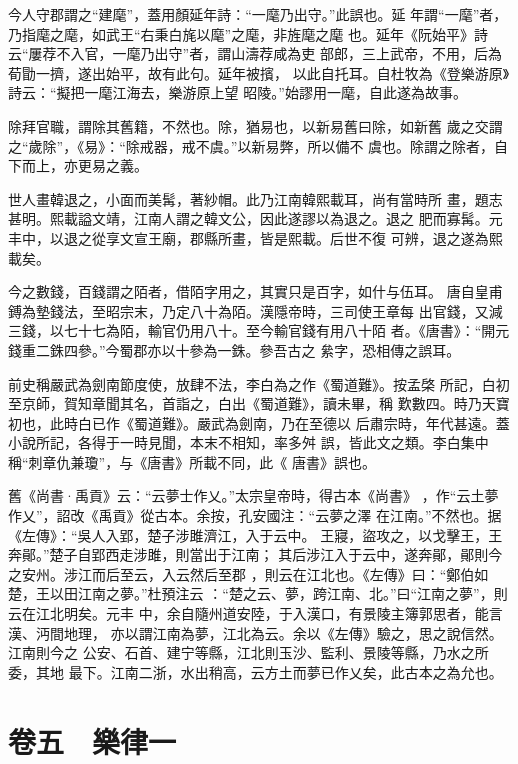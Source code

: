 \documentclass{ctexart}
\begin{document}
今人守郡謂之``建麾''，蓋用顏延年詩：``一麾乃出守。''此誤也。延 年謂``一麾''者，乃指麾之麾，如武王``右秉白旄以麾''之麾，非旌麾之麾 也。延年《阮始平》詩云``屢荐不入官，一麾乃出守''者，謂山濤荐咸為吏 部郎，三上武帝，不用，后為荀勖一擠，遂出始平，故有此句。延年被擯， 以此自托耳。自杜牧為《登樂游原》詩云：``擬把一麾江海去，樂游原上望 昭陵。''始謬用一麾，自此遂為故事。

除拜官職，謂除其舊籍，不然也。除，猶易也，以新易舊曰除，如新舊 歲之交謂之``歲除''，《易》：``除戒器，戒不虞。''以新易弊，所以備不 虞也。除謂之除者，自下而上，亦更易之義。

世人畫韓退之，小面而美髯，著紗帽。此乃江南韓熙載耳，尚有當時所 畫，題志甚明。熙載謚文靖，江南人謂之韓文公，因此遂謬以為退之。退之 肥而寡髯。元丰中，以退之從享文宣王廟，郡縣所畫，皆是熙載。后世不復 可辨，退之遂為熙載矣。

今之數錢，百錢謂之陌者，借陌字用之，其實只是百字，如什与伍耳。 唐自皇甫鎛為墊錢法，至昭宗末，乃定八十為陌。漢隱帝時，三司使王章每 出官錢，又減三錢，以七十七為陌，輸官仍用八十。至今輸官錢有用八十陌 者。《唐書》：``開元錢重二銖四參。''今蜀郡亦以十參為一銖。參吾古之 絫字，恐相傳之誤耳。

前史稱嚴武為劍南節度使，放肆不法，李白為之作《蜀道難》。按孟棨 所記，白初至京師，賀知章聞其名，首詣之，白出《蜀道難》，讀未畢，稱 歎數四。時乃天寶初也，此時白已作《蜀道難》。嚴武為劍南，乃在至德以 后肅宗時，年代甚遠。蓋小說所記，各得于一時見聞，本末不相知，率多舛 誤，皆此文之類。李白集中稱``刺章仇兼瓊''，与《唐書》所載不同，此《 唐書》誤也。

舊《尚書·禹貢》云：``云夢士作乂。''太宗皇帝時，得古本《尚書》 ，作``云土夢作乂''，詔改《禹貢》從古本。余按，孔安國注：``云夢之澤 在江南。''不然也。据《左傳》：``吳人入郢，楚子涉雎濟江，入于云中。 王寢，盜攻之，以戈擊王，王奔鄖。''楚子自郢西走涉雎，則當出于江南； 其后涉江入于云中，遂奔鄖，鄖則今之安州。涉江而后至云，入云然后至郡 ，則云在江北也。《左傳》曰：``鄭伯如楚，王以田江南之夢。''杜預注云 ：``楚之云、夢，跨江南、北。''曰``江南之夢''，則云在江北明矣。元丰 中，余自隨州道安陸，于入漢口，有景陵主簿郭思者，能言漢、沔間地理， 亦以謂江南為夢，江北為云。余以《左傳》驗之，思之說信然。江南則今之 公安、石首、建宁等縣，江北則玉沙、監利、景陵等縣，乃水之所委，其地 最下。江南二浙，水出稍高，云方土而夢已作乂矣，此古本之為允也。
\clearpage
\section{卷五　樂律一}
\end{document}
